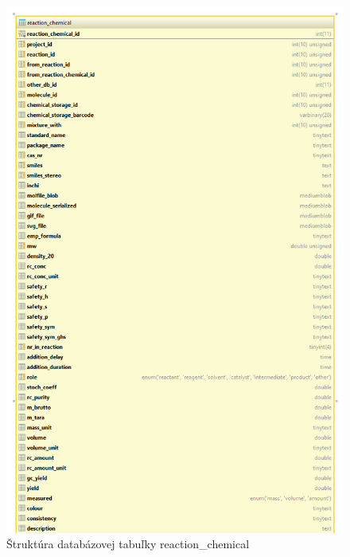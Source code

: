 \documentclass[thesis=M,slovak]{FITthesis}[2013/05/06]
\begin{document}
\begin{figure}\centering
	\includegraphics[width=1.0\textwidth]{Schema_DB_Open_Enventory/reaction_chemical_1.png}
 	\caption[Štruktúra databázovej tabuľky reaction\_chemical]{Štruktúra databázovej tabuľky reaction\_chemical}\label{graphics:reactionChemical1}
\end{figure}

\end{document}
